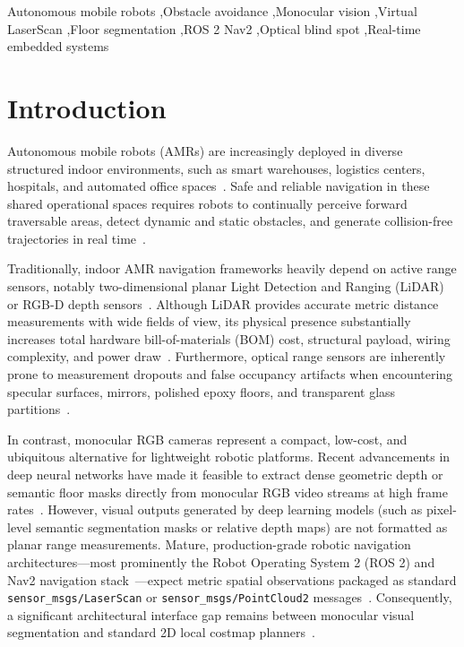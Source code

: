 \documentclass[preprint,12pt]{elsarticle}
\begin{document}
\begin{frontmatter}
\begin{keyword}
Autonomous mobile robots \sep Obstacle avoidance \sep Monocular vision \sep Virtual LaserScan \sep Floor segmentation \sep ROS 2 Nav2 \sep Optical blind spot \sep Real-time embedded systems
\end{keyword}

\end{frontmatter}


\section{Introduction}
\label{sec:introduction}

Autonomous mobile robots (AMRs) are increasingly deployed in diverse structured indoor environments, such as smart warehouses, logistics centers, hospitals, and automated office spaces~\cite{gvrnextgenerationtechnologiesresearchteam_2026_autonomous,liu_2024_a}. Safe and reliable navigation in these shared operational spaces requires robots to continually perceive forward traversable areas, detect dynamic and static obstacles, and generate collision-free trajectories in real time~\cite{macenski_2020_the,yang_2019_semantic}.

Traditionally, indoor AMR navigation frameworks heavily depend on active range sensors, notably two-dimensional planar Light Detection and Ranging (LiDAR) or RGB-D depth sensors~\cite{li_2020_lidar,yusuf_2022_iotbased}. Although LiDAR provides accurate metric distance measurements with wide fields of view, its physical presence substantially increases total hardware bill-of-materials (BOM) cost, structural payload, wiring complexity, and power draw~\cite{liu_2024_a}. Furthermore, optical range sensors are inherently prone to measurement dropouts and false occupancy artifacts when encountering specular surfaces, mirrors, polished epoxy floors, and transparent glass partitions~\cite{deepthadamodaran_2023_experimental,yang_2011_on,tibebu_2021_lidarbased,sajjan_2020_clear,singh_2020_multidata}.

In contrast, monocular RGB cameras represent a compact, low-cost, and ubiquitous alternative for lightweight robotic platforms. Recent advancements in deep neural networks have made it feasible to extract dense geometric depth or semantic floor masks directly from monocular RGB video streams at high frame rates~\cite{shariqfarooqbhat_2021_adabins,ranftl_2021_vision,ultralytics_2024_ultralytics}. However, visual outputs generated by deep learning models (such as pixel-level semantic segmentation masks or relative depth maps) are not formatted as planar range measurements. Mature, production-grade robotic navigation architectures---most prominently the Robot Operating System 2 (ROS 2) and Nav2 navigation stack~\cite{macenski_2022_robot,macenski_2023_from}---expect metric spatial observations packaged as standard \texttt{sensor\_msgs/LaserScan} or \texttt{sensor\_msgs/PointCloud2} messages~\cite{openrobotics_sensor_msgslaserscan}. Consequently, a significant architectural interface gap remains between monocular visual segmentation and standard 2D local costmap planners~\cite{openrobotics_2020_depthimage_to_laserscan,opennavigationllc_2023_costmap}.
\end{document}

